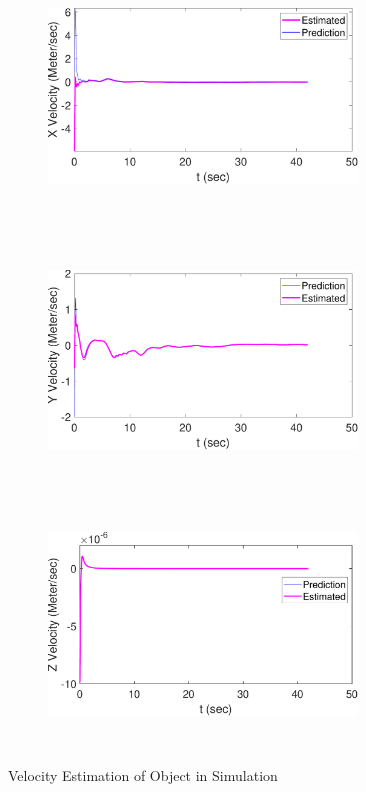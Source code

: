 \begin{figure}
    \centering
    \begin{subfigure}
        \centering
        \includegraphics[height=6.5cm,width=0.9\textwidth]{Images/X_Vel.pdf}
    \end{subfigure}
    \begin{subfigure}
        \centering
        \includegraphics[height=6.5cm,width=0.9\textwidth]{Images/Y_Vel.pdf}
    \end{subfigure}
    \begin{subfigure}
        \centering
        \includegraphics[height=6.5cm,width=0.9\textwidth]{Images/Z_Vel.pdf}
    \end{subfigure}
    \caption{Velocity Estimation of Object in Simulation}
    \label{Velestimation}
\end{figure}

